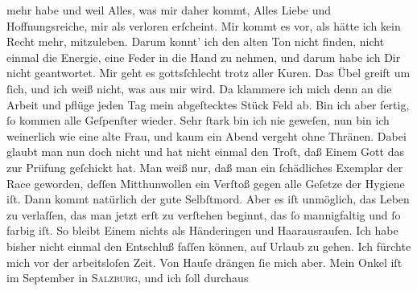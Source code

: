 \begin{ledgroupsized}[t]{13cm}
               mehr habe und weil Alles, was mir daher kommt, Alles Liebe und Hoffnungsreiche, mir
               als verloren erſcheint. Mir kommt es vor, als hätte ich kein Recht mehr, mitzuleben.
               Darum konnt’ ich den alten Ton nicht finden, nicht einmal die Energie, eine Feder in
               die Hand zu nehmen, und darum habe ich Dir nicht geantwortet. Mir geht es
               gottsſchlecht trotz aller Kuren. Das Übel greift um ſich, und ich weiß nicht, was aus
               mir wird. Da klammere ich mich denn an die Arbeit und pflüge jeden Tag mein
               abgeſtecktes Stück Feld ab. Bin ich aber fertig, ſo kommen alle Geſpenſter {\pb}wieder. Sehr ſtark bin ich nie geweſen, nun bin ich
               weinerlich wie eine alte Frau, und kaum ein Abend vergeht ohne Thränen. Dabei glaubt
               man nun doch nicht und hat nicht einmal den Troſt, daß Einem Gott das zur Prüfung
               geſchickt hat. Man weiß nur, daß man ein ſchädliches Exemplar der Race geworden,
               deſſen Mitthunwollen ein Verſtoß gegen alle Geſetze der Hygiene iſt. Dann kommt
               natürlich der gute Selbſtmord. Aber es iſt unmöglich, das Leben zu verlaſſen, das man
               jetzt erſt zu verſtehen beginnt, das ſo mannigfaltig und ſo farbig iſt. So bleibt
               Einem nichts als Händeringen und Haarausraufen.\pend
           \pstart
           Ich habe bisher nicht einmal den Entschluß faſſen können, auf Urlaub zu gehen. {\pb}Ich fürchte mich vor der arbeitsloſen Zeit. Von
               Hauſe drängen ſie mich aber. Mein Onkel iſt im September in \textsc{Salzburg}, und ich ſoll durchaus \label{K_L02711-2v}
\end{ledgroupsized}
